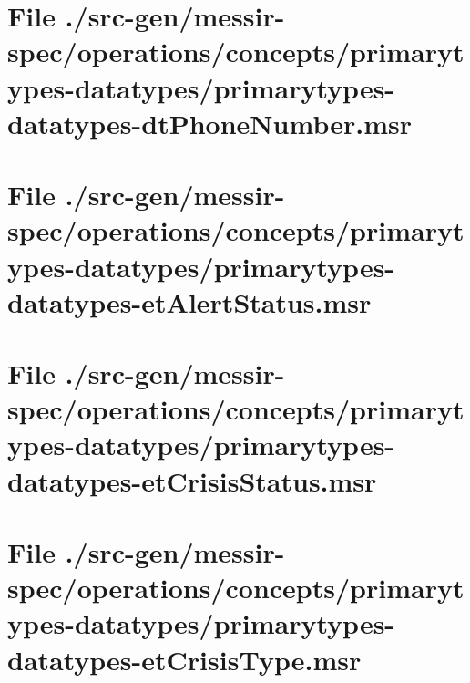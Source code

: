 \section[File /src-gen/messir-spec.../primarytypes-datatypes-dtPhoneNumber.msr]{File ./src-gen/messir-spec/operations/concepts/primarytypes-datatypes/primarytypes-datatypes-dtPhoneNumber.msr}
\scriptsize

\normalsize
	
\section[File /src-gen/messir-spec.../primarytypes-datatypes-etAlertStatus.msr]{File ./src-gen/messir-spec/operations/concepts/primarytypes-datatypes/primarytypes-datatypes-etAlertStatus.msr}
\scriptsize

\normalsize
	
\section[File /src-gen/messir-spec.../primarytypes-datatypes-etCrisisStatus.msr]{File ./src-gen/messir-spec/operations/concepts/primarytypes-datatypes/primarytypes-datatypes-etCrisisStatus.msr}
\scriptsize

\normalsize
	
\section[File /src-gen/messir-spec/operations.../primarytypes-datatypes-etCrisisType.msr]{File ./src-gen/messir-spec/operations/concepts/primarytypes-datatypes/primarytypes-datatypes-etCrisisType.msr}
\scriptsize

\normalsize
	
